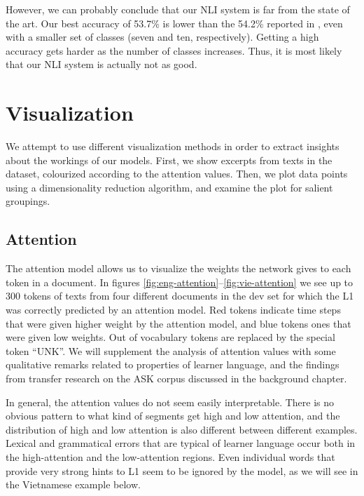 However, we can probably conclude that our \ac{NLI} system is far from the
state of the art. Our best accuracy of 53.7\% is lower than the 54.2\%
reported in \textcite{malmasi2018native}, even with a smaller set of classes
(seven and ten, respectively). Getting a high accuracy gets harder as the
number of classes increases. Thus, it is most likely that our \ac{NLI} system
is actually not as good.


\section{Visualization}

We attempt to use different visualization methods in order to extract
insights about the workings of our models. First, we show excerpts from texts
in the dataset, colourized according to the attention values. Then, we plot
data points using a dimensionality reduction algorithm, and examine the plot
for salient groupings.


\subsection{Attention} \label{subsec:attentionvis}

The attention model allows us to visualize the weights the network gives to
each token in a document. In figures
\ref{fig:eng-attention}--\ref{fig:vie-attention} we see up to 300 tokens of
texts from four different documents in the dev set for which the L1 was
correctly predicted by an attention model. Red tokens indicate time steps
that were given higher weight by the attention model, and blue tokens ones
that were given low weights. Out of vocabulary tokens are replaced by the
special token ``UNK''. We will supplement the analysis of attention values
with some qualitative remarks related to properties of learner language, and
the findings from transfer research on the ASK corpus discussed in the
background chapter.

In general, the attention values do not seem easily interpretable. There is
no obvious pattern to what kind of segments get high and low attention, and
the distribution of high and low attention is also different between
different examples. Lexical and grammatical errors that are typical of
learner language occur both in the high-attention and the low-attention
regions. Even individual words that provide very strong hints to \ac{L1} seem
to be ignored by the model, as we will see in the Vietnamese example below.

